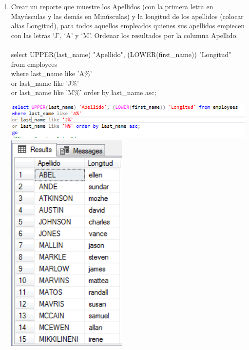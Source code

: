 \begin{enumerate}[1.]
	\item Crear un reporte que muestre los Apellidos (con la primera letra en May\'usculas y las demás en Min\'usculas) y la longitud de los apellidos (colocar alias Longitud), para todos aquellos empleados quienes sus apellidos empiecen con las letras ‘J’, ‘A’ y ‘M’. Ordenar los resultados por la columna Apellido.
	\\
	\\select UPPER(last\_name) "Apellido", (LOWER(first\_name)) "Longitud" 
	\\from employees 
	\\where last\_name like 'A\%'
     	\\ or last\_name like 'J\%'
      	\\or last\_name like 'M\%' order by last\_name asc;
      	\begin{center}
	\includegraphics[width=17cm]{./Imagenes/actividad_05_04a}
	\includegraphics[width=6cm]{./Imagenes/actividad_05_04}
	\end{center}


\end{enumerate}
